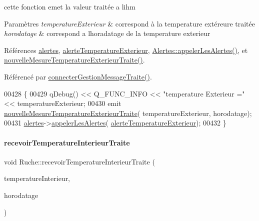 cette fonction emet la valeur traitée a l\textquotesingle{}ihm 
\begin{DoxyParams}{Paramètres}
{\em temperature\+Exterieur} & correspond à la temperature extéreure traitée \\
\hline
{\em horodatage} & correspond a l\textquotesingle{}horadatage de la temperature exterieur \\
\hline
\end{DoxyParams}


Références \hyperlink{class_ruche_af07644ddce44cb5ed4286475dc0f9d46}{alertes}, \hyperlink{parametres_8h_a83a725fd153179a2bd97afcc8307737ba300b33d38ff264e971908d263fbfd1bb}{alerte\+Temperature\+Exterieur}, \hyperlink{class_alertes_ad04a02dcc6e6f14da0784c7054888b05}{Alertes\+::appeler\+Les\+Alertes()}, et \hyperlink{class_ruche_a5b85ea246b58776a96e2ff7bd701daa7}{nouvelle\+Mesure\+Temperature\+Exterieur\+Traite()}.



Référencé par \hyperlink{class_ruche_a20ec8c6dc931218e5cf682050fe845d9}{connecter\+Gestion\+Message\+Traite()}.


\begin{DoxyCode}
00428 \{
00429     qDebug() << Q\_FUNC\_INFO << \textcolor{stringliteral}{"temperature Exterieur ="} << temperatureExterieur;
00430     emit \hyperlink{class_ruche_a5b85ea246b58776a96e2ff7bd701daa7}{nouvelleMesureTemperatureExterieurTraite}(
      temperatureExterieur, horodatage);
00431     \hyperlink{class_ruche_af07644ddce44cb5ed4286475dc0f9d46}{alertes}->\hyperlink{class_alertes_ad04a02dcc6e6f14da0784c7054888b05}{appelerLesAlertes}(
      \hyperlink{parametres_8h_a83a725fd153179a2bd97afcc8307737ba300b33d38ff264e971908d263fbfd1bb}{alerteTemperatureExterieur});
00432 \}
\end{DoxyCode}
\mbox{\label{class_ruche_a3a5934e6da843c959f34aecef1217f92}} 
\paragraph{\texorpdfstring{recevoir\+Temperature\+Interieur\+Traite}{recevoirTemperatureInterieurTraite}}
{\footnotesize\ttfamily void Ruche\+::recevoir\+Temperature\+Interieur\+Traite (\begin{DoxyParamCaption}\item[{double}]{temperature\+Interieur,  }\item[{Q\+String}]{horodatage }\end{DoxyParamCaption})\hspace{0.3cm}{\ttfamily [slot]}}

